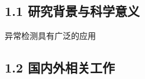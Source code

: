 \subsection{\xiaosihao \songti \bfseries 1.1 研究背景与科学意义}
异常检测具有广泛的应用



\subsection{\xiaosihao \songti \bfseries 1.2 国内外相关工作}

